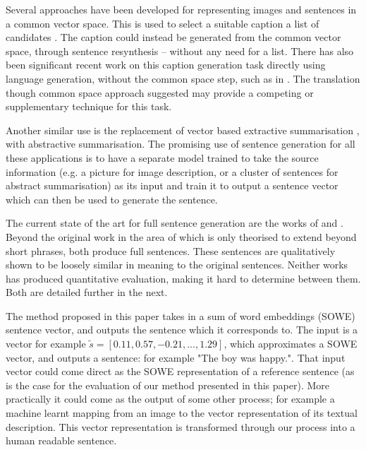 \documentclass[11pt]{article}
\theoremstyle{plain}
\theoremstyle{definition}
\begin{document}
Several approaches have been developed for representing images and sentences in a common vector space. This is used to select a suitable caption a list of candidates \parencite{farhadi2010every,socherDTRNN}. The caption could instead be generated from the common vector space, through sentence resynthesis -- without any need for a list. There has also been significant recent work on this caption generation task directly using language generation, without the common space step, such as in \textcite{donahue2014long,Mao2014GenerateImageDesc}. The translation though common space approach suggested may provide a competing or supplementary technique for this task.

Another similar use is the replacement of vector based extractive summarisation \textcite{KaagebExtractiveSummaristation,yogatamaextractive}, with abstractive summarisation. The promising use of sentence generation for all these applications is to have a separate model trained to take the source information (e.g. a picture for image description, or a cluster of sentences for abstract summarisation) as its input and train it to output a sentence vector which can then be used to generate the sentence.

The current state of the art for full sentence generation are the works of \cite{iyyer2014generating} and \cite{Bowman2015SmoothGeneration}. Beyond the original work in the area of \cite{Dinu2014CompositionalGeneration} which is only theorised to extend beyond short phrases, both produce full sentences. These sentences are qualitatively shown to be loosely similar in meaning to the original sentences. Neither works has produced quantitative evaluation, making it hard to determine between them. Both are detailed further in the next.


The method proposed in this paper takes in a sum of word embeddings (SOWE) sentence vector, and outputs the sentence which it corresponds to. The input is a vector for example $\tilde{s}=[0.11, 0.57,-0.21,...,1.29]$, which approximates a SOWE vector, and outputs a sentence: for example "The boy was happy.". That input vector could come direct as the SOWE representation of a reference sentence (as is the case for the evaluation of our method presented in this paper). More practically it could come as the output of some other process; for example a machine learnt mapping from an image to the vector representation of its textual description. This vector representation is transformed through our process into a human readable sentence.
\end{document}
